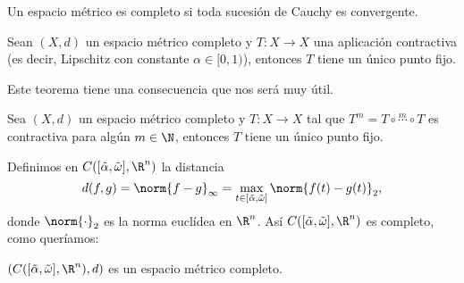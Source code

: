 \documentclass[../ecuaciones_diferenciales.tex]{subfiles}
\begin{document}
\begin{definition}
	Un espacio métrico es completo si toda sucesión de Cauchy es convergente.
\end{definition}

\begin{theorem}
	Sean \((X, d)\) un espacio métrico completo y \(T : X \to X\) una aplicación
	contractiva (es decir, Lipschitz con constante \(\alpha \in [0, 1)\)), entonces
	\(T\) tiene un único punto fijo.
\end{theorem}

Este teorema tiene una consecuencia que nos será muy útil.

\begin{corollary}
	Sea \((X, d)\) un espacio métrico completo y \(T : X \to X\) tal que
	\(T^m = T \circ \overset{m}{\cdots} \circ T\) es contractiva para algún
	\(m \in \N\), entonces \(T\) tiene un único punto fijo.
\end{corollary}

Definimos en \(C([\tilde{\alpha}, \tilde{\omega}], \R^n)\) la distancia
\[d(f, g) = \norm{f - g}_{\infty} = \max_{t \in [\tilde{\alpha},
			\tilde{\omega}]} \norm{f(t) - g(t)}_2,\] donde \(\norm{\cdot}_2\) es la
norma euclídea en \(\R^n\). Así \(C([\tilde{\alpha}, \tilde{\omega}], \R^n)\)
es completo, como queríamos:

\begin{proposition}
	\(\left( C([\tilde{\alpha}, \tilde{\omega}], \R^n), d \right)\) es un espacio
	métrico completo.
\end{proposition}
\end{document}
